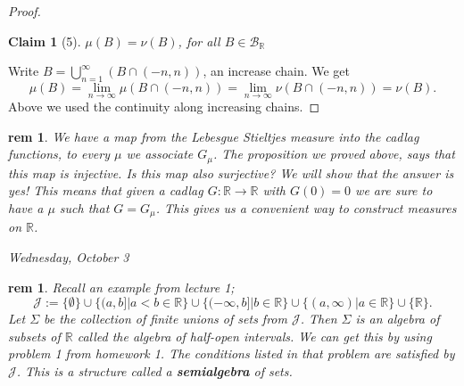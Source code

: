 \documentclass[letterpaper, 12pt]{article}
\newcommand{\fin}{\qquad \quad \hfill \framebox[1.75mm][l]{\,}}
\newcommand{\cB}{\mathcal{B}}
\newcommand{\cJ} {\mathcal{J}}
\newcommand{\bR}{\mathbb{R}}
\theoremstyle{stdthm}
\theoremstyle{stddef}
\newtheorem{rem}[thm]{rem} %
\theoremstyle{stdnonum}
\newtheorem{claim}{Claim}
\theoremstyle{stdqands}
\theoremstyle{stdbold}
\begin{document}
\begin{proof}
\begin{claim}[5]
$\mu(B) = \nu(B)$, for all $B \in \cB_\bR$
\end{claim}
Write $B = \bigcup_{n=1}^\infty (B \cap(-n,n))$, an increase chain. We get
\[
\mu(B) = \lim_{n\rightarrow \infty} \mu (B \cap (-n,n))
= \lim_{n\rightarrow \infty} \nu(B \cap (-n,n))
= \nu(B).
\]
Above we used the continuity along increasing chains. 
\end{proof}

\begin{rem}
We have a map from the Lebesgue Stieltjes measure into the cadlag functions, to every $\mu$ we associate $G_\mu$. The proposition we proved above, says that this map is injective. Is this map also surjective? We will show that the answer is yes! This means that given a cadlag $G:\bR \rightarrow \bR$ with $G(0) =0$ we are sure to have a $\mu$ such that $G = G_\mu$. This gives us a convenient way to construct measures on $\bR$. 
\end{rem}
\newpage

\begin{center}
\emph{Wednesday, October 3}
\end{center}

\begin{rem}
Recall an example from lecture 1; 
\[
\cJ:=  \{\emptyset\} \cup \{ (a,b] | a<b \in \bR\} \cup \{(-\infty, b]| b\in \bR\} \cup \{(a,\infty)| a \in \bR\} \cup \{\bR\}.
\]
Let $\Sigma$ be the collection of finite unions of sets from $\cJ$.  Then $\Sigma$ is an algebra of subsets of $\bR$ called the algebra of half-open intervals. We can get this by using problem 1 from homework 1.  The conditions listed in that problem are satisfied by $\cJ$. This is a structure called a {\bf semialgebra} of sets. 
\end{rem}
\end{document}
